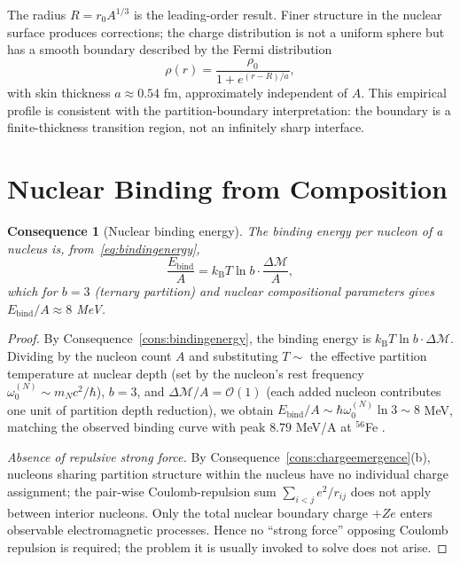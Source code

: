 \documentclass[11pt,twocolumn,a4paper]{article}
\theoremstyle{axiomstyle}
\theoremstyle{conseqstyle}
\newtheorem{consequence}{Consequence}
\theoremstyle{definition}
\theoremstyle{remark}
\newcommand{\kB}{k_{\mathrm{B}}}
\newcommand{\Depth}{\mathcal{M}}
\begin{document}
The radius $R=r_{0}A^{1/3}$ is the leading-order result. Finer structure in the nuclear surface produces corrections; the charge distribution is not a uniform sphere but has a smooth boundary described by the Fermi distribution
\begin{equation*}
\rho(r)=\frac{\rho_{0}}{1+e^{(r-R)/a}},
\end{equation*}
with skin thickness $a\approx 0.54$ fm, approximately independent of $A$. This empirical profile is consistent with the partition-boundary interpretation: the boundary is a finite-thickness transition region, not an infinitely sharp interface.

\section{Nuclear Binding from Composition}
\label{sec:nuclearbinding}

\begin{consequence}[Nuclear binding energy]
\label{cons:nuclearbinding}
The binding energy per nucleon of a nucleus is, from~\eqref{eq:bindingenergy},
\begin{equation}
\frac{E_{\mathrm{bind}}}{A}=\kB T\ln b\cdot\frac{\Delta\Depth}{A},
\label{eq:nuclearbinding}
\end{equation}
which for $b=3$ (ternary partition) and nuclear compositional parameters gives $E_{\mathrm{bind}}/A\approx 8$ MeV.
\end{consequence}

\begin{proof}
By Consequence~\ref{cons:bindingenergy}, the binding energy is $\kB T\ln b\cdot\Delta\Depth$. Dividing by the nucleon count $A$ and substituting $T\sim$ the effective partition temperature at nuclear depth (set by the nucleon's rest frequency $\omega_{0}^{(N)}\sim m_{N}c^{2}/\hbar$), $b=3$, and $\Delta\Depth/A=\mathcal{O}(1)$ (each added nucleon contributes one unit of partition depth reduction), we obtain $E_{\mathrm{bind}}/A\sim\hbar\omega_{0}^{(N)}\ln 3\sim 8$ MeV, matching the observed binding curve with peak $8.79$ MeV/A at $^{56}$Fe \citep{audi2017,krane1988}.

\emph{Absence of repulsive strong force.} By Consequence~\ref{cons:chargeemergence}(b), nucleons sharing partition structure within the nucleus have no individual charge assignment; the pair-wise Coulomb-repulsion sum $\sum_{i<j}e^{2}/r_{ij}$ does not apply between interior nucleons. Only the total nuclear boundary charge $+Ze$ enters observable electromagnetic processes. Hence no ``strong force'' opposing Coulomb repulsion is required; the problem it is usually invoked to solve does not arise.
\end{proof}
\end{document}
